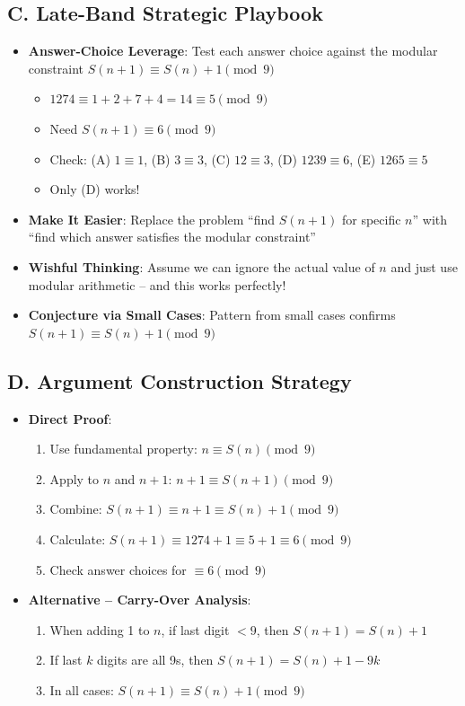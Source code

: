 \documentclass[]{article}
\begin{document}
\begin{strategicbox}
\subsection*{C. Late-Band Strategic Playbook}
\begin{itemize}[leftmargin=*]
    \item \textbf{Answer-Choice Leverage}: Test each answer choice against the modular constraint $S(n+1) \equiv S(n) + 1 \pmod{9}$
    \begin{itemize}
        \item $1274 \equiv 1 + 2 + 7 + 4 = 14 \equiv 5 \pmod{9}$
        \item Need $S(n+1) \equiv 6 \pmod{9}$
        \item Check: (A) $1 \equiv 1$, (B) $3 \equiv 3$, (C) $12 \equiv 3$, (D) $1239 \equiv 6$, (E) $1265 \equiv 5$
        \item Only (D) works!
    \end{itemize}
    \item \textbf{Make It Easier}: Replace the problem ``find $S(n+1)$ for specific $n$'' with ``find which answer satisfies the modular constraint''
    \item \textbf{Wishful Thinking}: Assume we can ignore the actual value of $n$ and just use modular arithmetic -- and this works perfectly!
    \item \textbf{Conjecture via Small Cases}: Pattern from small cases confirms $S(n+1) \equiv S(n) + 1 \pmod{9}$
\end{itemize}

\subsection*{D. Argument Construction Strategy}
\begin{itemize}[leftmargin=*]
    \item \textbf{Direct Proof}: 
    \begin{enumerate}
        \item Use fundamental property: $n \equiv S(n) \pmod{9}$
        \item Apply to $n$ and $n+1$: $n+1 \equiv S(n+1) \pmod{9}$
        \item Combine: $S(n+1) \equiv n+1 \equiv S(n) + 1 \pmod{9}$
        \item Calculate: $S(n+1) \equiv 1274 + 1 \equiv 5 + 1 \equiv 6 \pmod{9}$
        \item Check answer choices for $\equiv 6 \pmod{9}$
    \end{enumerate}
    \item \textbf{Alternative -- Carry-Over Analysis}: 
    \begin{enumerate}
        \item When adding 1 to $n$, if last digit $< 9$, then $S(n+1) = S(n) + 1$
        \item If last $k$ digits are all 9s, then $S(n+1) = S(n) + 1 - 9k$
        \item In all cases: $S(n+1) \equiv S(n) + 1 \pmod{9}$
    \end{enumerate}
\end{itemize}


\end{strategicbox}
\end{document}
